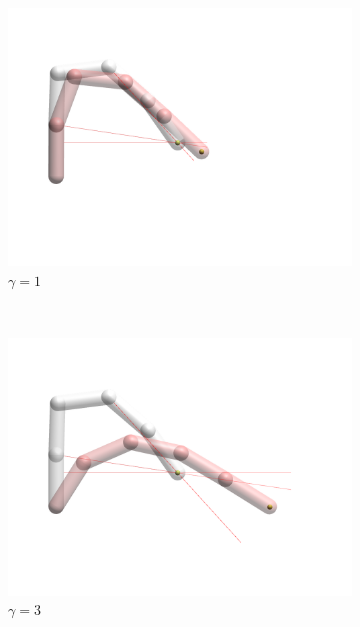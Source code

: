 \begin{figure}[h]
    
    \begin{subfigure}[b]{.3\textwidth}
        \includegraphics[width=\textwidth]{Figures/distortions/distortions1.png}
        \caption{$\gamma = 1$}
    \end{subfigure}
    ~
    \begin{subfigure}[b]{.3\textwidth}
        \includegraphics[width=\textwidth]{Figures/distortions/distortions3.png}
        \caption{$\gamma = 3$}
    \end{subfigure}
    ~
    \begin{subfigure}[b]{.3\textwidth}

\end{subfigure}
\end{figure}
